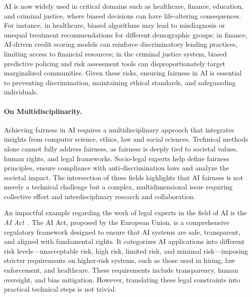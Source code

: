 \documentclass[12pt,a4paper,openright,twoside]{book}
\begin{document}

\ac{AI} is now widely used in critical domains such as healthcare, finance, education, and criminal justice, where biased decisions can have life-altering consequences.
%
For instance, in healthcare, biased algorithms may lead to misdiagnosis or unequal treatment recommendations for different demographic groups;
%
in finance, \ac{AI}-driven credit scoring models can reinforce discriminatory lending practices, limiting access to financial resources;
%
in the criminal justice system, biased predictive policing and risk assessment tools can disproportionately target marginalized communities.
%
Given these risks, ensuring fairness in \ac{AI} is essential to preventing discrimination, maintaining ethical standards, and safeguarding individuals.


\paragraph{On Multidisciplinarity.}


Achieving fairness in \ac{AI} requires a multidisciplinary approach that integrates insights from computer science, ethics, law and social sciences.
%
Technical methods alone cannot fully address fairness, as fairness is deeply tied to societal values, human rights, and legal frameworks.
%
Socio-legal experts help define fairness principles, ensure compliance with anti-discrimination laws and analyze the societal impact.
%
The intersection of these fields highlights that \ac{AI} fairness is not merely a technical challenge but a complex, multidimensional issue requiring collective effort and interdisciplinary research and collaboration.


An impactful example regarding the work of legal experts in the field of \acl{AI} is the \textit{AI Act}~\cite{madiega2021artificial}.
%
The AI Act, proposed by the European Union, is a comprehensive regulatory framework designed to ensure that AI systems are safe, transparent, and aligned with fundamental rights.
%
It categorizes AI applications into different risk levels—unacceptable risk, high risk, limited risk, and minimal risk—imposing stricter requirements on higher-risk systems, such as those used in hiring, law enforcement, and healthcare.
%
These requirements include transparency, human oversight, and bias mitigation.
%
However, translating these legal constraints into practical technical steps is not trivial.
\end{document}
